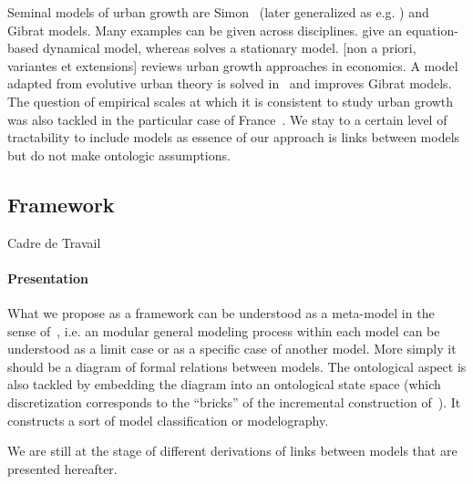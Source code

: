 Seminal models of urban growth are Simon~\cite{simon1955class} (later generalized as e.g. \cite{haran1973modified}) and Gibrat models. 
 Many examples can be given across disciplines. \cite{benguigui2007dynamic} give an equation-based dynamical model, whereas \cite{gabaix1999zipf} solves a stationary model. [non a priori, variantes et extensions] \cite{Gabaix20042341} reviews urban growth approaches in economics. A model adapted from evolutive urban theory is solved in~\cite{favaro2011gibrat} and improves Gibrat models. The question of empirical scales at which it is consistent to study urban growth was also tackled in the particular case of France~\cite{bretagnolle2002time}. We stay to a certain level of tractability to include models as essence of our approach is links between models but do not make ontologic assumptions.




\subsection{Framework}{Cadre de Travail}


\paragraph{Presentation}
What we propose as a framework can be understood as a meta-model in the sense of~\cite{cottineau2015incremental}, i.e. an modular general modeling process within each model can be understood as a limit case or as a specific case of another model. More simply it should be a diagram of formal relations between models.
 The ontological aspect is also tackled by embedding the diagram into an ontological state space (which discretization corresponds to the ``bricks'' of the incremental construction of~\cite{cottineau2015incremental}). It constructs a sort of model classification or modelography. 

We are still at the stage of different derivations of links between models that are presented hereafter.


